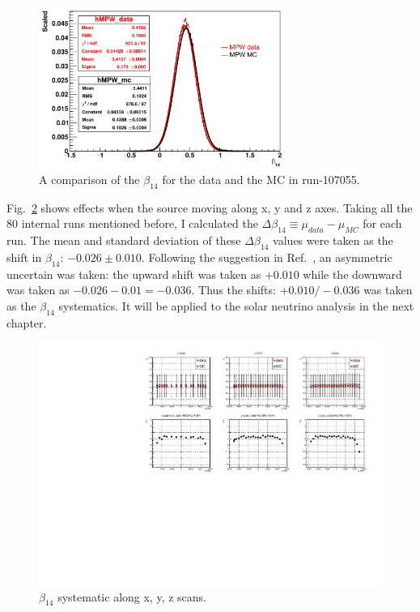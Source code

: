 \begin{figure}[htbp]
	\centering
	\includegraphics[width=8cm]{N16FitMPW_beta14_107055.png}
	\caption{A comparison of the $\beta_{14}$ for the data and the MC in run-107055.}
	\label{fig:N16beta14MPW}
\end{figure}

Fig.~\ref{beta14_XYZscans} shows effects when the source moving along x, y and z axes. Taking all the 80 internal runs mentioned before, I calculated the $\Delta \beta_{14}\equiv\mu_{data}-\mu_{MC}$ for each run. The mean and standard deviation of these $\Delta \beta_{14}$ values were taken as the shift in $\beta_{14}$: $-0.026\pm0.010$. Following the suggestion in Ref.~\cite{waterunidoc}, an asymmetric uncertain was taken: the upward shift was taken as $+0.010$ while the downward was taken as $-0.026-0.01=-0.036$. Thus the shifts: $+0.010/-0.036$ was taken as the $\beta_{14}$ systematics. It will be applied to the solar neutrino analysis in the next chapter. 

\begin{figure}[htbp]
	\centering
	\includegraphics[width=15cm]{beta14_xyzScans.pdf}
	\caption{$\beta_{14}$ systematic along x, y, z scans.}
	\label{beta14_XYZscans}
\end{figure}

